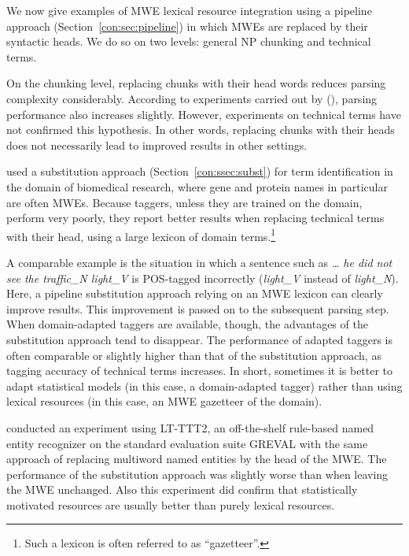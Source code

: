 \documentclass[output=paper]{langsci/langscibook}
\begin{document}
We now give examples of MWE lexical resource integration using a pipeline approach (Section~\ref{con:sec:pipeline}) in which MWEs are replaced by their syntactic heads. We do so on two levels: general NP chunking and technical terms.


On the chunking level, replacing chunks with their head words reduces parsing complexity considerably. 
According to experiments carried out by \citeauthor{prins05}\linebreak(\citeyear{prins05}), parsing performance also increases slightly. 
However, experiments on technical terms have not confirmed this hypothesis.
In other words, replacing chunks with their heads does not necessarily lead to improved results in other settings. 


\citet{weeds-ea07} used a substitution approach (Section~\ref{con:ssec:subst}) for term identification in the domain of biomedical research, where gene and protein names in particular are often MWEs. Because taggers, unless they are trained on the domain, perform very poorly, they report better results when replacing technical terms with their head, using a large lexicon of domain terms.\footnote{Such a lexicon is often referred to as ``gazetteer''.}

A comparable example is the situation in which a sentence such as 
%
\textit{\ldots{} he did not see the traffic\_N light\_V} 
%
is POS-tagged incorrectly (\textit{light\_V} instead of \textit{light\_N}). Here, a pipeline substitution approach relying on an MWE lexicon can clearly improve results. This improvement is passed on to the subsequent parsing step. 
When domain-adapted taggers are available, though, the advantages of the substitution approach tend to disappear. 
The performance of adapted taggers is often comparable or slightly higher than that of the substitution approach, as tagging accuracy of technical terms increases. 
In short, sometimes it is better to adapt statistical models (in this case, a domain-adapted tagger) rather than using lexical resources (in this case, an MWE gazetteer of the domain).%

\citet{schneider:2014} conducted an experiment using LT-TTT2, an off-the-shelf rule-based named entity recognizer \citep{grover08} on the standard evaluation suite GREVAL \citep{carroll-ea04} with the same approach of replacing multiword named entities by the head of the MWE. The performance of the substitution approach was slightly worse than when leaving the MWE unchanged. %
Also this experiment did confirm that statistically motivated resources are usually better than purely lexical resources.
\end{document}
